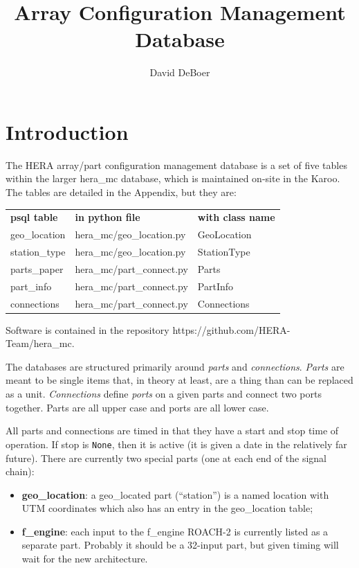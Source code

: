 \documentclass{article}[10pt]
\begin{document}
\author{David DeBoer}
\title{Array Configuration Management Database}
\maketitle

\section{Introduction}
The HERA array/part configuration management database is a set of five tables within the larger hera\_mc database, which is maintained on-site in the Karoo.  The tables are detailed in the Appendix,
but they are:

\begin{center}
\begin{tabular}{l l l}
         {\bf psql table} & {\bf in python file}  &  {\bf with class name} \\
	geo\_location 	& hera\_mc/geo\_location.py & GeoLocation \\
	station\_type 	& hera\_mc/geo\_location.py & StationType \\
	parts\_paper 	& hera\_mc/part\_connect.py & Parts \\
	part\_info 	         & hera\_mc/part\_connect.py & PartInfo \\
	connections 	& hera\_mc/part\_connect.py & Connections \\
\end{tabular}
\end{center}

Software is contained in the repository https://github.com/HERA-Team/hera\_mc.

The databases are structured primarily around {\em parts} and {\em connections}.  {\em Parts} are meant to be single items that, in theory at least, are a thing than can be replaced as a unit.
{\em Connections} define {\em ports} on a given parts and connect two ports together.  Parts are all upper case and ports are all lower case.

All parts and connections are timed in that they have a start and stop time of operation.  If stop is {\tt None}, then it is active (it is given a date in the relatively far future).  There are currently two special parts (one at each end of the signal chain):
\begin{itemize}
	\item {\bf geo\_location}: a geo\_located part (``station'') is a named location with UTM coordinates which also has an entry in the geo\_location table;
	\item {\bf f\_engine}:  each input to the f\_engine ROACH-2 is currently listed as a separate part.  Probably it should be a 32-input part, but given timing will wait for the new architecture.
\end{itemize}
\end{document}

